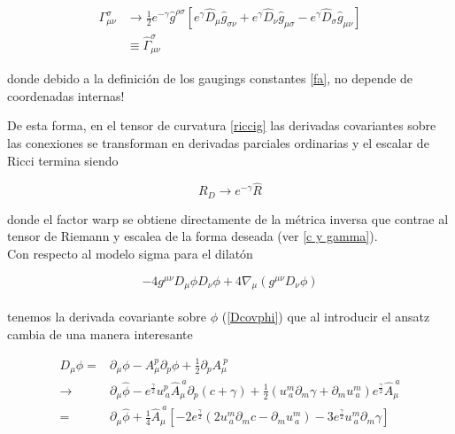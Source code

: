 \documentclass{article}
\numberwithin{equation}{section}
\begin{document}
\begin{equation}\label{gammahat}
\begin{aligned}
\Gamma^{\sigma}_{\mu \nu} &\longrightarrow \frac{1}{2} e^{-\gamma}\hat{g}^{\rho \sigma}\left[ e^{\gamma}\hat{D}_{\mu} \hat{g}_{\sigma \nu} + e^{\gamma}\hat{D}_{\nu} \hat{g}_{\mu \sigma} - e^{\gamma}\hat{D}_{\sigma} \hat{g}_{\mu \nu}\right]\\
&\equiv \hat{\Gamma}^{\sigma}_{\mu \nu}
\end{aligned} 
\end{equation}

donde debido a la definición de los gaugings constantes \ref{fa}, no depende de coordenadas internas!

De esta forma, en el tensor de curvatura \ref{riccig} las derivadas covariantes sobre las conexiones se transforman en derivadas parciales ordinarias y el escalar de Ricci termina siendo

\begin{boxeq}
	\begin{equation}
	R_D \longrightarrow e^{- \gamma} \hat{R}
	\end{equation}
\end{boxeq}

donde el factor warp se obtiene directamente de la métrica inversa que contrae al tensor de Riemann y escalea de la forma deseada (ver \ref{c y gamma}).\\

Con respecto al modelo sigma para el dilatón

\begin{equation}
-4g^{\mu \nu} D_{\mu} \phi D_{\nu} \phi + 4 \nabla_{\mu} \left(g^{\mu \nu} D_{\nu} \phi\right)
\end{equation}\\

tenemos la derivada covariante sobre $ \phi $ (\ref{Dcovphi}) que al introducir el ansatz cambia de una manera interesante

\begin{equation}
\begin{aligned}
D_{\mu} \phi =& \partial_{\mu} \phi - A_{\mu}^p \partial_p \phi + \frac{1}{2} \partial_p A_{\mu}^{\ p}\\
\longrightarrow& \partial_{\mu} \hat{\phi} - e^{\frac{\gamma}{2}} u^{p}_{\ a} \hat{A}_{\mu}^{\ a} \partial_{p}(c + \gamma) + \frac{1}{2} \left( u^{m}_{\ a} \partial_m \gamma + \partial_m u^{m}_{\ a}\right) e^{\frac{\gamma}{2}} \hat{A}_{\mu}^{\ a}\\
=& \partial_{\mu} \hat{\phi} + \frac{1}{4} \hat{A}_{\mu}^{\ a} \left[ -2e^{\frac{\gamma}{2}} \left( 2u^{m}_{\ a} \partial_{m}c - \partial_m u^{m}_{\ a} \right) -3 e^{\frac{\gamma}{2}} u^{m}_{\ a} \partial_m \gamma\right]
\end{aligned}
\end{equation}
\end{document}

